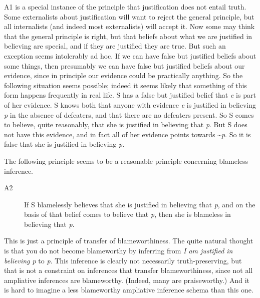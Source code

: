 \documentclass[
  11pt,
  letterpaper,
  DIV=11,
  numbers=noendperiod,
  oneside]{scrartcl}
\begin{document}
A1 is a special instance of the principle that justification does not
entail truth. Some externalists about justification will want to reject
the general principle, but all internalists (and indeed most
externalists) will accept it. Now some may think that the general
principle is right, but that beliefs about what we are justified in
believing are special, and if they are justified they are true. But such
an exception seems intolerably ad hoc. If we can have false but
justified beliefs about some things, then presumably we can have false
but justified beliefs about our evidence, since in principle our
evidence could be practically anything. So the following situation seems
possible; indeed it seems likely that something of this form happens
frequently in real life. S has a false but justified belief that
\emph{e} is part of her evidence. S knows both that anyone with evidence
\emph{e} is justified in believing \emph{p} in the absence of defeaters,
and that there are no defeaters present. So S comes to believe, quite
reasonably, that she is justified in believing that \emph{p}. But S does
not have this evidence, and in fact all of her evidence points towards
\textasciitilde{}\emph{p}. So it is false
that she is justified in believing \emph{p}.

The following principle seems to be a reasonable principle concerning
blameless inference.

\begin{description}
\item[A2]
If S blamelessly believes that she is justified in believing that
\emph{p}, and on the basis of that belief comes to believe that
\emph{p}, then she is blameless in believing that \emph{p}.
\end{description}

This is just a principle of transfer of blameworthiness. The quite
natural thought is that you do not become blameworthy by inferring from
\emph{I am justified in believing p} to \emph{p}. This inference is
clearly not necessarily truth-preserving, but that is not a constraint
on inferences that transfer blameworthiness, since not all ampliative
inferences are blameworthy. (Indeed, many are praiseworthy.) And it is
hard to imagine a less blameworthy ampliative inference schema than this
one.
\end{document}
